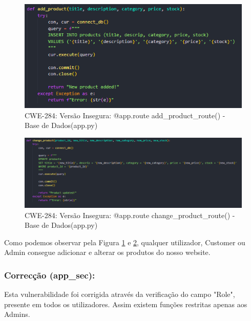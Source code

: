 \begin{figure}[H]
  \centering
  \includegraphics[width=16cm]{images/CWE-284-product_route.png}
  \caption{CWE-284: Versão Insegura: @app.route add\_product\_route() - Base de Dados(app.py)}
  \label{fig:cwe284-add-product-route}
\end{figure}

\begin{figure}[H]
  \centering
  \includegraphics[width=16cm]{images/CWE-284-change_product_route.png}
  \caption{CWE-284: Versão Insegura: @app.route change\_product\_route() - Base de Dados(app.py)}
  \label{fig:cwe284-change-product-route}
\end{figure}

Como podemos observar pela Figura \ref{fig:cwe284-add-product-route} e \ref{fig:cwe284-change-product-route}, qualquer utilizador, Customer ou Admin consegue adicionar e alterar os produtos do nosso website.
 

\subsubsection{Correcção (app\_sec):}

Esta vulnerabilidade foi corrigida através da verificação do campo "Role", presente em todos os utilizadores. Assim existem funções restritas apenas aos Admins.


